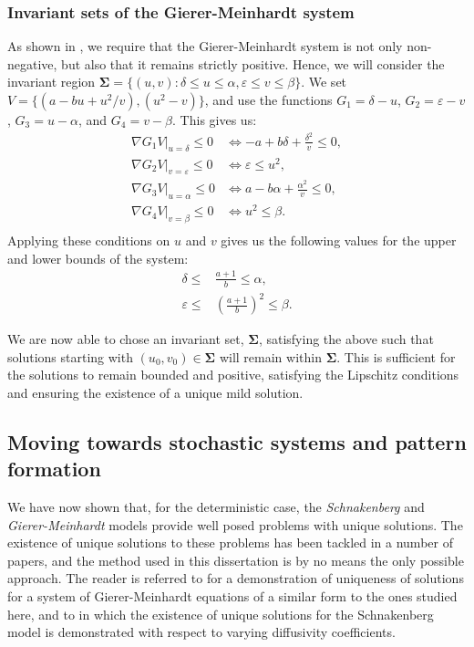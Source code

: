 \documentclass[12pt]{article}
\begin{document}
\subsubsection{Invariant sets of the Gierer-Meinhardt system}
As shown in , we require that the Gierer-Meinhardt system is not only non-negative, but also that it remains strictly positive. Hence, we will consider the invariant region $\mathbf{\Sigma} = \lbrace (u,v) : \delta \leq u \leq \alpha, \varepsilon \leq v \leq \beta\rbrace$. We set $V = \lbrace (a - bu + u^2/v),(u^2 - v)\rbrace$, and use the functions $G_1 = \delta - u$, $G_2 = \varepsilon - v$, $G_3 = u - \alpha$, and $G_4 = v - \beta$. This gives us:
\begin{align*}
    \left.\nabla G_1 V\right|_{u=\delta} \leq 0 &\Longleftrightarrow -a + b\delta + \frac{\delta^2}{v} \leq 0, \\
    \left.\nabla G_2 V\right|_{v=\varepsilon} \leq 0 &\Longleftrightarrow \varepsilon \leq u^2 ,\\
    \left.\nabla G_3 V\right|_{u=\alpha} \leq 0 &\Longleftrightarrow a - b\alpha + \frac{\alpha^2}{v} \leq 0, \\
    \left.\nabla G_4 V\right|_{v=\beta} \leq 0 &\Longleftrightarrow u^2 \leq \beta. \\
\end{align*}
Applying these conditions on $u$ and $v$ gives us the following values for the upper and lower bounds of the system:
\begin{align*}
    \delta \leq &\frac{a+1}{b} \leq \alpha,\\
    \varepsilon \leq &\left(\frac{a+1}{b}\right)^2 \leq \beta.
\end{align*}

We are now able to chose an invariant set, $\mathbf{\Sigma}$, satisfying the above such that solutions starting with $(u_0,v_0) \in \mathbf{\Sigma}$ will remain within $\mathbf{\Sigma}$. This is sufficient for the solutions to remain bounded and positive, satisfying the Lipschitz conditions and ensuring the existence of a unique mild solution.

\subsection{Moving towards stochastic systems and pattern formation}

We have now shown that, for the deterministic case, the \textit{Schnakenberg} and \textit{Gierer-Meinhardt} models provide well posed problems with unique solutions. The existence of unique solutions to these problems has been tackled in a number of papers, and the method used in this dissertation is by no means the only possible approach. The reader is referred to \cite{Kelkel} for a demonstration of uniqueness of solutions for a system of Gierer-Meinhardt equations of a similar form to the ones studied here, and to \cite{Li} in which the existence of unique solutions for the Schnakenberg model is demonstrated with respect to varying diffusivity coefficients. 
\end{document}
